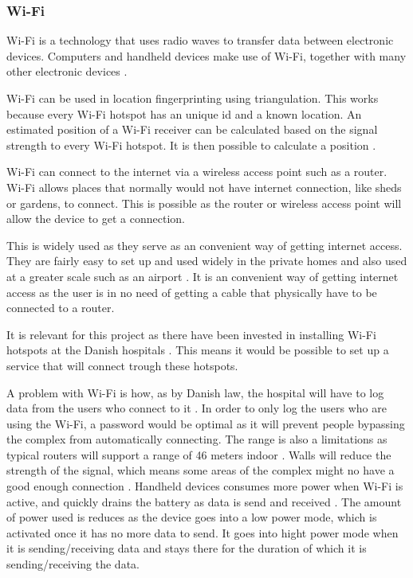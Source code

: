 \subsubsection{Wi-Fi} \label{wifitech}
Wi-Fi is a technology that uses radio waves to transfer data between electronic devices. Computers and handheld devices make use of Wi-Fi, together with many other electronic devices \cite{wifi_devices}.

Wi-Fi can be used in location fingerprinting using triangulation. This works because every Wi-Fi hotspot has an unique id and a known location. An estimated position of a Wi-Fi receiver can be calculated based on the signal strength to every Wi-Fi hotspot. It is then possible to calculate a position  \cite{Liu2007}.

Wi-Fi can connect to the internet via a wireless access point such as a router. Wi-Fi allows places that normally would not have internet connection, like sheds or gardens, to connect. This is possible as the router or wireless access point will allow the device to get a connection.

This is widely used as they serve as an convenient way of getting internet access. They are fairly easy to set up and used widely in the private homes and also used at a greater scale such as an airport \cite{wifi_works}. It is an convenient way of getting internet access as the user is in no need of getting a cable that physically have to be connected to a router.

It is relevant for this project as there have been invested in installing Wi-Fi hotspots at the Danish hospitals \cite{wifi_hospi}. This means it would be possible to set up a service that will connect trough these hotspots.

A problem with Wi-Fi is how, as by Danish law, the hospital will have to log data from the users who connect to it \cite{wifi_log}. In order to only log the users who are using the Wi-Fi, a password would be optimal as it will prevent people bypassing the complex from automatically connecting. The range is also a limitations as typical routers will support a range of 46 meters indoor \cite{wifi_range}. Walls will reduce the strength of the signal, which means some areas of the complex might no have a good enough connection \cite{wifi_wall}. Handheld devices consumes more power when Wi-Fi is active, and quickly drains the battery as data is send and received \cite{wifi_batt}. The amount of power used is reduces as the device goes into a low power mode, which is activated once it has no more data to send. It goes into hight power mode when it is sending/receiving data and stays there for the duration of which it is sending/receiving the data.
